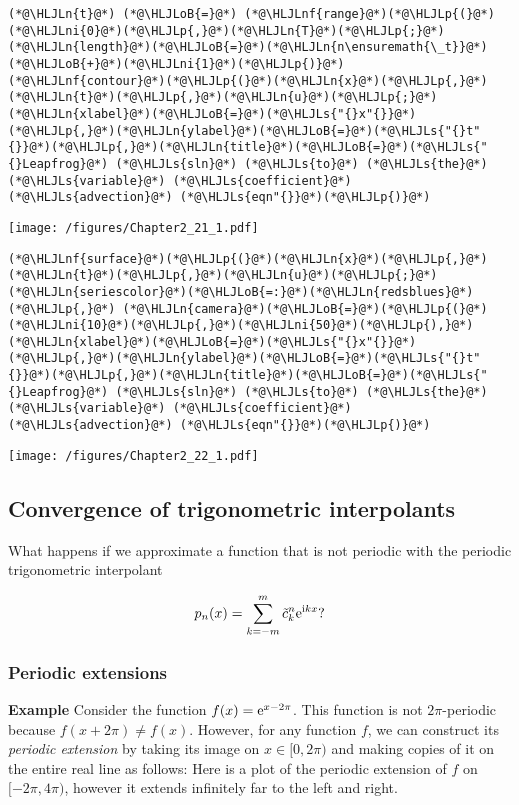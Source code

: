 \documentclass[12pt,landscape]{article}
\newcommand{\HLJLn}[1]{#1}
\newcommand{\HLJLnf}[1]{\textcolor[RGB]{66,102,213}{#1}}
\newcommand{\HLJLs}[1]{\textcolor[RGB]{201,61,57}{#1}}
\newcommand{\HLJLni}[1]{\textcolor[RGB]{59,151,46}{#1}}
\newcommand{\HLJLoB}[1]{\textcolor[RGB]{102,102,102}{\textbf{#1}}}
\newcommand{\HLJLp}[1]{#1}
\begin{document}
{\begin{lstlisting}
(*@\HLJLn{t}@*) (*@\HLJLoB{=}@*) (*@\HLJLnf{range}@*)(*@\HLJLp{(}@*)(*@\HLJLni{0}@*)(*@\HLJLp{,}@*)(*@\HLJLn{T}@*)(*@\HLJLp{;}@*)(*@\HLJLn{length}@*)(*@\HLJLoB{=}@*)(*@\HLJLn{n\ensuremath{\_t}}@*)(*@\HLJLoB{+}@*)(*@\HLJLni{1}@*)(*@\HLJLp{)}@*)
(*@\HLJLnf{contour}@*)(*@\HLJLp{(}@*)(*@\HLJLn{x}@*)(*@\HLJLp{,}@*)(*@\HLJLn{t}@*)(*@\HLJLp{,}@*)(*@\HLJLn{u}@*)(*@\HLJLp{;}@*)(*@\HLJLn{xlabel}@*)(*@\HLJLoB{=}@*)(*@\HLJLs{"{}x"{}}@*)(*@\HLJLp{,}@*)(*@\HLJLn{ylabel}@*)(*@\HLJLoB{=}@*)(*@\HLJLs{"{}t"{}}@*)(*@\HLJLp{,}@*)(*@\HLJLn{title}@*)(*@\HLJLoB{=}@*)(*@\HLJLs{"{}Leapfrog}@*) (*@\HLJLs{sln}@*) (*@\HLJLs{to}@*) (*@\HLJLs{the}@*) (*@\HLJLs{variable}@*) (*@\HLJLs{coefficient}@*) (*@\HLJLs{advection}@*) (*@\HLJLs{eqn"{}}@*)(*@\HLJLp{)}@*)
\end{lstlisting}

\texttt{[image: /figures/Chapter2\_21\_1.pdf]}

\begin{lstlisting}
(*@\HLJLnf{surface}@*)(*@\HLJLp{(}@*)(*@\HLJLn{x}@*)(*@\HLJLp{,}@*)(*@\HLJLn{t}@*)(*@\HLJLp{,}@*)(*@\HLJLn{u}@*)(*@\HLJLp{;}@*)(*@\HLJLn{seriescolor}@*)(*@\HLJLoB{=:}@*)(*@\HLJLn{redsblues}@*)(*@\HLJLp{,}@*) (*@\HLJLn{camera}@*)(*@\HLJLoB{=}@*)(*@\HLJLp{(}@*)(*@\HLJLni{10}@*)(*@\HLJLp{,}@*)(*@\HLJLni{50}@*)(*@\HLJLp{),}@*)
(*@\HLJLn{xlabel}@*)(*@\HLJLoB{=}@*)(*@\HLJLs{"{}x"{}}@*)(*@\HLJLp{,}@*)(*@\HLJLn{ylabel}@*)(*@\HLJLoB{=}@*)(*@\HLJLs{"{}t"{}}@*)(*@\HLJLp{,}@*)(*@\HLJLn{title}@*)(*@\HLJLoB{=}@*)(*@\HLJLs{"{}Leapfrog}@*) (*@\HLJLs{sln}@*) (*@\HLJLs{to}@*) (*@\HLJLs{the}@*) (*@\HLJLs{variable}@*) (*@\HLJLs{coefficient}@*) (*@\HLJLs{advection}@*) (*@\HLJLs{eqn"{}}@*)(*@\HLJLp{)}@*)
\end{lstlisting}

\texttt{[image: /figures/Chapter2\_22\_1.pdf]}

\subsection{Convergence of trigonometric interpolants}
What happens if we approximate a function that is not periodic with the periodic trigonometric interpolant

\[
p_n(x) = \sum_{k=-m}^{m}\tilde{c}^n_k{\rm e}^{{\rm i}kx}?
\]
\subsubsection{Periodic extensions}
\textbf{Example} Consider the function $f(x) = {\rm e}^{x-2\pi}$. This function is not  $2\pi$-periodic because $f(x + 2\pi) \neq f(x)$. However, for any function $f$, we can construct its \emph{periodic extension} by taking its image on $x \in [0, 2\pi)$ and making copies of it on the entire real line as follows:  Here is a plot of the periodic extension of $f$ on $[-2\pi, 4\pi)$, however it extends infinitely far to the left and right.


}
\end{document}
